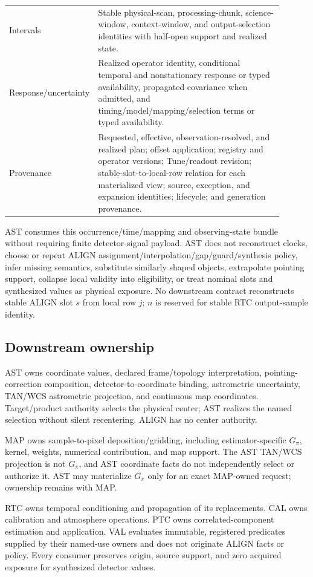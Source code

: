 \begin{longtable}{L{0.22\linewidth}L{0.68\linewidth}}
Intervals & Stable physical-scan, processing-chunk, science-window,
context-window, and output-selection identities with half-open support and
realized state.\\
Response/uncertainty & Realized operator identity, conditional temporal and
nonstationary response or typed availability, propagated covariance when
admitted, and timing/model/mapping/selection terms or typed availability.\\
Provenance & Requested, effective, observation-resolved, and realized plan;
offset application; registry and operator versions; Tune/readout revision;
stable-slot-to-local-row relation for each materialized view; source,
exception, and expansion identities; lifecycle; and generation provenance.\\
\bottomrule
\end{longtable}

AST consumes this occurrence/time/mapping and observing-state bundle without
requiring finite detector-signal payload.  AST does not reconstruct clocks,
choose or repeat ALIGN assignment/interpolation/gap/guard/synthesis policy,
infer missing semantics, substitute similarly shaped objects, extrapolate
pointing support, collapse local validity into eligibility, or treat nominal
slots and synthesized values as physical exposure.
No downstream contract reconstructs stable ALIGN slot \(s\) from local row
\(j\); \(n\) is reserved for stable RTC output-sample identity.

\subsection{Downstream ownership}

AST owns coordinate values, declared frame/topology interpretation,
pointing-correction composition, detector-to-coordinate binding, astrometric
uncertainty, TAN/WCS astrometric projection, and continuous map coordinates.
Target/product authority selects the physical center; AST realizes the named
selection without silent recentering.  ALIGN has no center authority.

MAP owns sample-to-pixel deposition/gridding, including estimator-specific
\(G_{\pi}\), kernel, weights, numerical contribution, and map support.  The
AST TAN/WCS projection is not \(G_{\pi}\), and AST coordinate facts do not
independently select or authorize it.  AST may materialize \(G_{\pi}\) only
for an exact MAP-owned request; ownership remains with MAP.

RTC owns temporal conditioning and propagation of its replacements.  CAL owns
calibration and atmosphere operations.  PTC owns correlated-component
estimation and application.  VAL evaluates immutable, registered predicates
supplied by their named-use owners and does not originate ALIGN facts or
policy.  Every consumer preserves origin, source support, and zero acquired
exposure for synthesized detector values.
